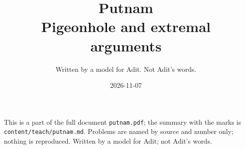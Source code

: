 
\title{Putnam\\[0.3em]\large Pigeonhole and extremal arguments}
\author{Written by a model for Adit. Not Adit's words.}
\date{2026-11-07}

\maketitle
\noindent\small This is a part of the full document \texttt{putnam.pdf}; the summary with the marks is \texttt{content/teach/putnam.md}. Problems are named by source and number only; nothing is reproduced. Written by a model for Adit; not Adit's words.\normalsize



